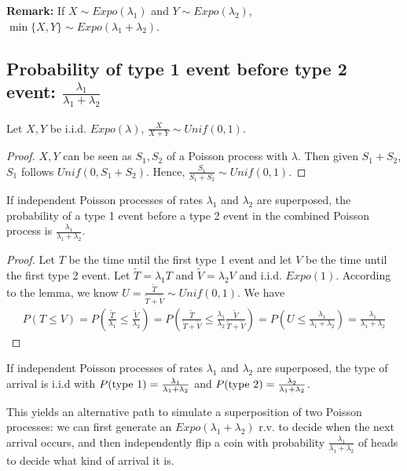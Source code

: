 \documentclass[11pt]{elegantbook}
\begin{document}
\textbf{Remark:} If $X\sim Expo(\lambda_1)$ and $Y\sim Expo(\lambda_2)$, $\min\{X,Y\}\sim Expo(\lambda_1+\lambda_2)$.

\subsection{Probability of type 1 event before type 2 event: $\frac{\lambda_1}{\lambda_1+\lambda_2}$}
\begin{lemma}
    Let $X,Y$ be i.i.d. $Expo(\lambda)$, $\frac{X}{X+Y}\sim Unif(0,1)$.
\end{lemma}
\begin{proof}
    $X,Y$ can be seen as $S_1,S_2$ of a Poisson process with $\lambda$. Then given $S_1+S_2$, $S_1$ follows $Unif(0,S_1+S_2)$. Hence, $\frac{S_1}{S_1+S_2}\sim Unif(0,1)$.
\end{proof}

\begin{theorem}
    If independent Poisson processes of rates $\lambda_1$ and $\lambda_2$ are superposed, the probability of a type 1 event before a type 2 event in the combined Poisson process is $\frac{\lambda_1}{\lambda_1+\lambda_2}$.
\end{theorem}
\begin{proof}
    Let $T$ be the time until the first type 1 event and let $V$ be the time until the first type
    2 event. Let $\tilde{T}=\lambda_1 T$ and $\tilde{V}=\lambda_2 V$ and i.i.d. $Expo(1)$. According to the lemma, we know $U=\frac{\tilde{T}}{\tilde{T}+\tilde{V}}\sim Unif(0,1)$. We have
    \begin{equation}
        \begin{aligned}
            P(T\leq V)=P\left(\frac{\tilde{T}}{\lambda_1}\leq \frac{\tilde{V}}{\lambda_2}\right)=P\left(\frac{\tilde{T}}{\tilde{T}+\tilde{V}}\leq \frac{\lambda_1}{\lambda_2}\frac{\tilde{V}}{\tilde{T}+\tilde{V}}\right)=P(U\leq\frac{\lambda_1}{\lambda_1+\lambda_2})=\frac{\lambda_1}{\lambda_1+\lambda_2}
        \end{aligned}
        \nonumber
    \end{equation}
\end{proof}

\begin{corollary}
    If independent Poisson processes of rates $\lambda_1$ and $\lambda_2$ are superposed, the type of arrival is i.i.d with $P(\textnormal{type 1})=\frac{\lambda_1}{\lambda_1+\lambda_2}$ and $P(\textnormal{type 2})=\frac{\lambda_2}{\lambda_1+\lambda_2}$.
\end{corollary}
This yields an alternative path to simulate a superposition of two Poisson processes:
we can first generate an $Expo(\lambda_1 +\lambda_2)$ r.v. to decide when the next arrival occurs, and then
independently flip a coin with probability $\frac{\lambda_1}{\lambda_1+\lambda_2}$ of heads to decide what kind of arrival it is.
\end{document}
